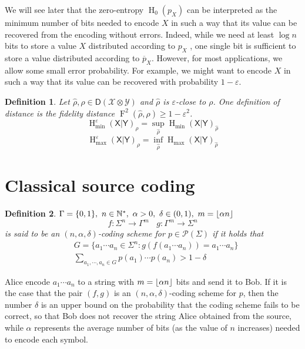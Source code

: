 \documentclass[aps,pra,onecolumn,notitlepage,superscriptaddress]{revtex4-1}
\DeclarePairedDelimiter{\floor}{\lfloor}{\rfloor}
\newcommand{\N}{\mathbb{N}}
\newcommand{\reg}[1]{\mathsf{#1}}
\newcommand{\spc}[1]{\mathcal{#1}}
\newcommand{\D}{\mathsf{D}}
\newcommand{\op}[1]{\operatorname{#1}}
\newtheorem{defi}{Definition}
\begin{document}
    We will see later that the zero-entropy $\op H_0(p_X)$ can be interpreted as the minimum number of bits needed to encode $X$ in such a way that its value can be recovered from the encoding without errors. Indeed, while we need at least $\log n$ bits to store a value $X$ distributed according to $p_X$ , one single bit is sufficient to store a value distributed according to $\overline p_X$. However, for most applications, we allow some small error probability. For example, we might want to encode $X$ in such a way that its value can be recovered with probability $1-\varepsilon$.
    \begin{defi}
        Let $\hat\rho, \rho \in \D(\spc X \otimes \spc Y)$ and $\hat\rho$ is $\varepsilon$-close to $\rho$. One definition of distance is the fidelity distance $\op F^2(\hat\rho, \rho) \geq 1 - \varepsilon^2$.
        \begin{equation}
            \op H_{\min}^\varepsilon (\reg X | \reg Y)_\rho = \sup_{\hat\rho} \op H_{\min} (\reg X | \reg Y)_{\hat\rho}
        \end{equation}
        \begin{equation}
            \op H_{\max}^\varepsilon (\reg X | \reg Y)_\rho = \inf_{\hat\rho} \op H_{\max} (\reg X | \reg Y)_{\hat\rho}
        \end{equation}
    \end{defi}

    \section{Classical source coding}
    \begin{defi}
        $\Gamma = \{ 0,1 \}, \ n \in \N^*,\ \alpha > 0,\ \delta \in (0,1), \ m = \floor{\alpha n}$
        \begin{equation}
            f : \Sigma^n \to \Gamma^m \ \ \ \ g : \Gamma^m \to \Sigma^n
        \end{equation}
        is said to be an $(n,\alpha,\delta)$-coding scheme for $p \in \spc P(\Sigma)$ if it holds that
        \begin{align}
            &G = \{ a_1 \cdots a_n \in \Sigma^n : g(f(a_1\cdots a_n)) = a_1\cdots a_n \} \\
            &\sum_{a_1, \cdots, a_n \in G} p(a_1) \cdots p(a_n) > 1-\delta
        \end{align}
    \end{defi}
    Alice encode $a_1\cdots a_n$ to a string with $ m = \floor{\alpha n}$ bits and send it to Bob. If it is the case that the pair $(f,g)$ is an $(n,\alpha,\delta)$-coding scheme for $p$, then the number $\delta$ is an upper bound on the probability that the coding scheme fails to be correct, so that Bob does not recover the string Alice obtained from the source, while $\alpha$ represents the average number of bits (as the value of $n$ increases) needed to encode each symbol.
\end{document}
